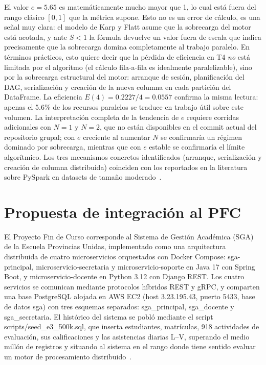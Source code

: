 \documentclass[11pt,a4paper]{article}
\begin{document}
El valor $e = 5.65$ es matemáticamente mucho mayor que 1, lo cual está fuera del rango clásico $[0,1]$ que la métrica supone. Esto no es un error de cálculo, es una señal muy clara: el modelo de Karp y Flatt asume que la sobrecarga del motor está acotada, y ante $S<1$ la fórmula devuelve un valor fuera de escala que indica precisamente que la sobrecarga domina completamente al trabajo paralelo. En términos prácticos, esto quiere decir que la pérdida de eficiencia en T4 \emph{no} está limitada por el algoritmo (el cálculo fila-a-fila es idealmente paralelizable), sino por la sobrecarga estructural del motor: arranque de sesión, planificación del DAG, serialización y creación de la nueva columna en cada partición del DataFrame. La eficiencia $E(4) = 0.2227/4 = 0.0557$ confirma la misma lectura: apenas el 5.6\% de los recursos paralelos se traduce en trabajo útil sobre este volumen. La interpretación completa de la tendencia de $e$ requiere corridas adicionales con $N=1$ y $N=2$, que no están disponibles en el commit actual del repositorio grupal; con $e$ creciente al aumentar $N$ se confirmaría un régimen dominado por sobrecarga, mientras que con $e$ estable se confirmaría el límite algorítmico. Los tres mecanismos concretos identificados (arranque, serialización y creación de columna distribuida) coinciden con los reportados en la literatura sobre PySpark en datasets de tamaño moderado~\cite{lehuy2023}.

\section{Propuesta de integración al PFC}
El Proyecto Fin de Curso corresponde al Sistema de Gestión Académica (SGA) de la Escuela Provincias Unidas, implementado como una arquitectura distribuida de cuatro microservicios orquestados con Docker Compose: sga-principal, microservicio-secretaria y microservicio-soporte en Java 17 con Spring Boot, y microservicio-docente en Python 3.12 con Django REST. Los cuatro servicios se comunican mediante protocolos híbridos REST y gRPC, y comparten una base PostgreSQL alojada en AWS EC2 (host 3.23.195.43, puerto 5433, base de datos sga) con tres esquemas separados: sga\_principal, sga\_docente y sga\_secretaria. El histórico del sistema se pobló mediante el script scripts/seed\_e3\_500k.sql, que inserta estudiantes, matrículas, 918 actividades de evaluación, sus calificaciones y las asistencias diarias L--V, superando el medio millón de registros y situando al sistema en el rango donde tiene sentido evaluar un motor de procesamiento distribuido~\cite{lizardo2026}.
\end{document}
